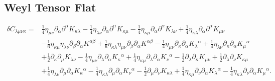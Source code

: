 \documentclass[10pt,letterpaper]{article}
\begin{document}
\subsection*{Weyl Tensor Flat}
\begin{align}
\delta C_{\lambda\mu\nu\kappa}={}&\tfrac{1}{4} \eta_{\mu \nu} \partial_{\alpha}\partial^{\alpha}K_{\kappa \lambda}
 -  \tfrac{1}{4} \eta_{\lambda \nu} \partial_{\alpha}\partial^{\alpha}K_{\kappa \mu}
 -  \tfrac{1}{4} \eta_{\kappa \mu} \partial_{\alpha}\partial^{\alpha}K_{\lambda \nu}
 + \tfrac{1}{4} \eta_{\kappa \lambda} \partial_{\alpha}\partial^{\alpha}K_{\mu \nu}\nonumber\\
& -  \tfrac{1}{6} \eta_{\kappa \mu} \eta_{\lambda \nu} \partial_{\beta}\partial_{\alpha}K^{\alpha \beta}
 + \tfrac{1}{6} \eta_{\kappa \lambda} \eta_{\mu \nu} \partial_{\beta}\partial_{\alpha}K^{\alpha \beta}
 -  \tfrac{1}{4} \eta_{\mu \nu} \partial_{\kappa}\partial_{\alpha}K_{\lambda}{}^{\alpha}
 + \tfrac{1}{4} \eta_{\lambda \nu} \partial_{\kappa}\partial_{\alpha}K_{\mu}{}^{\alpha}\nonumber\\
& + \tfrac{1}{2} \partial_{\kappa}\partial_{\mu}K_{\lambda \nu}
 -  \tfrac{1}{4} \eta_{\mu \nu} \partial_{\lambda}\partial_{\alpha}K_{\kappa}{}^{\alpha}
 + \tfrac{1}{4} \eta_{\kappa \mu} \partial_{\lambda}\partial_{\alpha}K_{\nu}{}^{\alpha}
 -  \tfrac{1}{2} \partial_{\lambda}\partial_{\kappa}K_{\mu \nu}
 + \tfrac{1}{2} \partial_{\lambda}\partial_{\nu}K_{\kappa \mu}\nonumber\\
& + \tfrac{1}{4} \eta_{\lambda \nu} \partial_{\mu}\partial_{\alpha}K_{\kappa}{}^{\alpha}
 -  \tfrac{1}{4} \eta_{\kappa \lambda} \partial_{\mu}\partial_{\alpha}K_{\nu}{}^{\alpha}
 -  \tfrac{1}{2} \partial_{\mu}\partial_{\nu}K_{\kappa \lambda}
 + \tfrac{1}{4} \eta_{\kappa \mu} \partial_{\nu}\partial_{\alpha}K_{\lambda}{}^{\alpha}
 -  \tfrac{1}{4} \eta_{\kappa \lambda} \partial_{\nu}\partial_{\alpha}K_{\mu}{}^{\alpha}.
\end{align}
%
\end{document}
